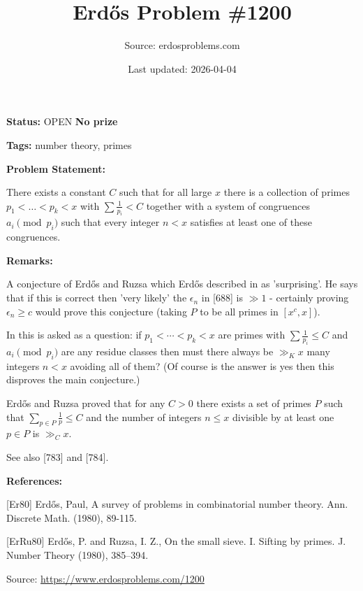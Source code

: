 \documentclass{article}
\title{Erd\H{o}s Problem \#1200}
\date{Last updated: 2026-04-04}
\author{Source: erdosproblems.com}
\begin{document}
\maketitle

\noindent\textbf{Status:} OPEN \quad \textbf{No prize}

\noindent\textbf{Tags:} number theory, primes

\medskip
\noindent\textbf{Problem Statement:}

There exists a constant $C$ such that for all large $x$ there is a collection of primes $p_1<\ldots<p_k<x$ with $\sum\frac{1}{p_i}<C$ together with a system of congruences $a_i\pmod{p_i}$ such that every integer $n<x$ satisfies at least one of these congruences.

\bigskip
\noindent\textbf{Remarks:}

A conjecture of Erd\H{o}s and Ruzsa which Erd\H{o}s described in \cite{Er80} as 'surprising'. He says that if this is correct then 'very likely' the $\epsilon_n$ in [688] is $\gg 1$ - certainly proving $\epsilon_n\geq c$ would prove this conjecture (taking $P$ to be all primes in $[x^c,x]$). 

In \cite{ErRu80} this is asked as a question: if $p_1<\cdots<p_k<x$ are primes with $\sum \frac{1}{p_i}\leq C$ and $a_i\pmod{p_i}$ are any residue classes then must there always be $\gg_K x$ many integers $n<x$ avoiding all of them? (Of course is the answer is yes then this disproves the main conjecture.)

Erd\H{o}s and Ruzsa \cite{ErRu80} proved that for any $C>0$ there exists a set of primes $P$ such that $\sum_{p\in P}\frac{1}{p}\leq C$ and the number of integers $n\leq x$ divisible by at least one $p\in P$ is $\gg_C x$.

See also [783] and [784].

\bigskip
\noindent\textbf{References:}

[Er80] Erd\H{o}s, Paul, A survey of problems in combinatorial number theory. Ann. Discrete Math. (1980), 89-115.
 
 [ErRu80] Erd\H{o}s, P. and Ruzsa, I. Z., On the small sieve. I. Sifting by primes. J. Number Theory (1980), 385--394.

\bigskip
\noindent\small{Source: \url{https://www.erdosproblems.com/1200}}
\end{document}
